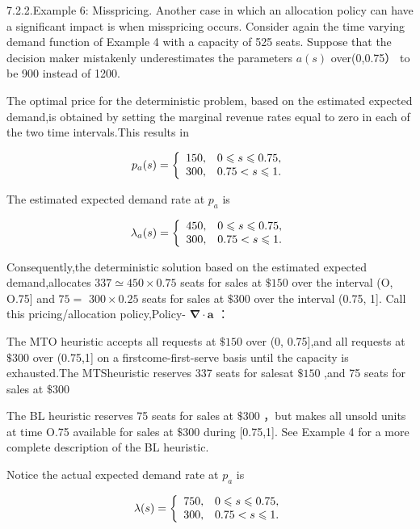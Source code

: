 7.2.2.Example 6: Misspricing. Another case in which an allocation policy
can have a significant impact is when misspricing occurs. Consider again
the time varying demand function of Example 4 with a capacity of 525
seats. Suppose that the decision maker mistakenly underestimates the
parameters \(a ( s )\) over(0,0.75） to be 900 instead of 1200.

The optimal price for the deterministic problem, based on the estimated
expected demand,is obtained by setting the marginal revenue rates equal
to zero in each of the two time intervals.This results in

\[
p _ { a } ( s ) = \left\{ \begin{array} { l l } { 1 5 0 , } & { 0 \leqslant s \leqslant 0 . 7 5 , } \\ { 3 0 0 , } & { 0 . 7 5 < s \leqslant 1 . } \end{array} \right.
\]

The estimated expected demand rate at \(p _ { a }\) is

\[
\lambda _ { a } ( s ) = \left\{ \begin{array} { l l } { 4 5 0 , } & { 0 \leqslant s \leqslant 0 . 7 5 , } \\ { 3 0 0 , } & { 0 . 7 5 < s \leqslant 1 . } \end{array} \right.
\]

Consequently,the deterministic solution based on the estimated expected
demand,allocates \(3 3 7 \simeq 4 5 0 \times 0 . 7 5\) seats for sales
at \(\$ 150\) over the interval (O, O.75{]} and \(7 5 =\)
\(3 0 0 \times 0 . 2 5\) seats for sales at \(\$ 300\) over the interval
(0.75, 1{]}. Call this pricing/allocation policy,Policy-
\(\mathbf { \nabla } \cdot \mathbf { a }\) ：

The MTO heuristic accepts all requests at \(\$ 150\) over (0,
0.75{]},and all requests at \(\$ 300\) over (0.75,1{]} on a
firstcome-first-serve basis until the capacity is exhausted.The
MTSheuristic reserves 337 seats for salesat \(\$ 150\) ,and 75 seats for
sales at \(\$ 300\)

The BL heuristic reserves 75 seats for sales at \(\$ 300\) ，but makes
all unsold units at time O.75 available for sales at \(\$ 300\) during
{[}0.75,1{]}. See Example 4 for a more complete description of the BL
heuristic.

Notice the actual expected demand rate at \(p _ { a }\) is

\[
\lambda ( s ) = \left\{ \begin{array} { l l } { 7 5 0 , } & { 0 \leqslant s \leqslant 0 . 7 5 , } \\ { 3 0 0 , } & { 0 . 7 5 < s \leqslant 1 . } \end{array} \right.
\]

